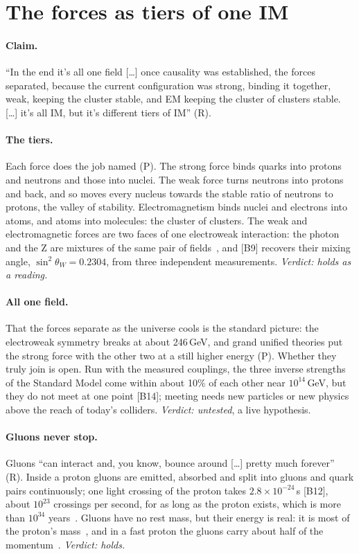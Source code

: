 \documentclass[11pt,a4paper]{article}
\theoremstyle{definition}
\newcommand{\chk}[1]{\textsf{[#1]}}
\newcommand{\tagR}{\textsf{(R)}}
\newcommand{\tagP}{\textsf{(P)}}
\begin{document}
\section{The forces as tiers of one IM}\label{sec:forces}

\paragraph{Claim.} ``In the end it's all one field [\dots] once causality was established, the forces separated, because the current
configuration was strong, binding it together, weak, keeping the cluster stable, and EM keeping the cluster of clusters stable. [\dots]
it's all IM, but it's different tiers of IM'' \tagR.

\paragraph{The tiers.} Each force does the job named \tagP. The strong force binds quarks into protons and neutrons and those into nuclei.
The weak force turns neutrons into protons and back, and so moves every nucleus towards the stable ratio of neutrons to protons, the valley of
stability. Electromagnetism binds nuclei and electrons into atoms, and atoms into molecules: the cluster of clusters. The weak and
electromagnetic forces are two faces of one electroweak interaction: the photon and the Z are mixtures of the same pair of
fields~\cite{glashow,weinberg,salam}, and \chk{B9} recovers their mixing angle, $\sin^2\theta_W=0.2304$, from three independent
measurements. \emph{Verdict: holds as a reading.}

\paragraph{All one field.} That the forces separate as the universe cools is the standard picture: the electroweak symmetry breaks at about
246\,GeV, and grand unified theories put the strong force with the other two at a still higher energy \tagP. Whether they truly join is
open. Run with the measured couplings, the three inverse strengths of the Standard Model come within about 10\% of each other near
$10^{14}$\,GeV, but they do not meet at one point \chk{B14}; meeting needs new particles or new physics above the reach of today's colliders.
\emph{Verdict: untested}, a live hypothesis.

\paragraph{Gluons never stop.} Gluons ``can interact and, you know, bounce around [\dots] pretty much forever'' \tagR. Inside a proton
gluons are emitted, absorbed and split into gluons and quark pairs continuously; one light crossing of the proton takes $2.8\times10^{-24}$\,s
\chk{B12}, about $10^{23}$ crossings per second, for as long as the proton exists, which is more than $10^{34}$ years~\cite{pdg}. Gluons have
no rest mass, but their energy is real: it is most of the proton's mass~\cite{yang}, and in a fast proton the gluons carry about half of the
momentum~\cite{pdg}. \emph{Verdict: holds.}
\end{document}
